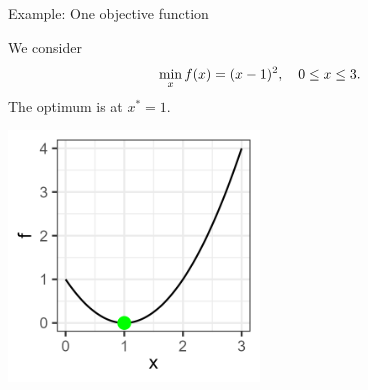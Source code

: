 \documentclass[11pt,compress,t,notes=noshow,xcolor=table]{beamer}
\begin{document}
\begin{vbframe}{Example: One objective function}

We consider 
\[
\min_{x} f(x) = (x - 1)^2, 
\quad 0 \le x \le 3.
\]
The optimum is at \(x^* = 1\).

\begin{center}
\includegraphics[width=0.5\textwidth]{figure_man/graph1.png}
\end{center}

\end{vbframe}
\end{document}
